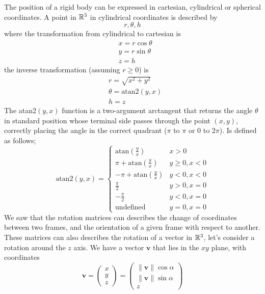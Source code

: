 \documentclass[10pt, letterpaper]{report}
\begin{document}
The position of a rigid body can be expressed in cartesian, cylindrical or spherical coordinates. A point in ${\mathbb R}^3$ in cylindrical coordinates is described by\begin{equation}
    r,\theta,h 
\end{equation}
where the transformation from cylindrical to cartesian is\begin{align}
    &x=r\cos\theta\\
    &y=r\sin\theta\\
    &z=h 
\end{align}
the inverse transformation (assuming $r\ge 0$) is\begin{align}
    &r=\sqrt{x^2+y^2}\\ 
    &\theta =\text{atan2}(y,x)\\
    &h=z
\end{align}
The atan2$(y, x)$ function is a two-argument arctangent that returns the angle $\theta$ in standard position whose terminal side passes through the point $(x, y)$, correctly placing the angle in the correct quadrant ($\pi$ to $\pi$ or $0$ to $2\pi$). Is defined as follows;\begin{equation}
    \text{atan2}(y, x) =
\begin{cases}
\text{atan}\left(\frac{y}{x}\right) & x > 0 \\
\pi + \text{atan}\left(\frac{y}{x}\right) & y \geq 0, x < 0 \\
-\pi + \text{atan}\left(\frac{y}{x}\right) & y < 0, x < 0 \\
\frac{\pi}{2} & y > 0, x = 0 \\
-\frac{\pi}{2} & y < 0, x = 0 \\
\text{undefined} & y = 0, x = 0
\end{cases}
\end{equation}
We saw that the rotation matrices can describes the change of coordinates between two frames, and the orientation of a given frame with respect to another. These matrices can also describes the rotation of a vector in ${\mathbb R}^3$, let's consider a rotation around the $z$ axis. We have a vector $\mathbf v$ that lies in the $xy$ plane, with coordinates $$\mathbf v=\begin{pmatrix}
    x\\ 
   y\\z
\end{pmatrix}=\begin{pmatrix}
    \|\mathbf v\|\cos\alpha\\ 
    \|\mathbf v\|\sin\alpha\\z
\end{pmatrix}$$
\end{document}
